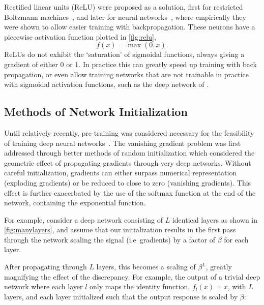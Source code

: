 \documentclass[thesis]{subfiles}
\begin{document}
Rectified linear units (ReLU) were proposed as a solution, first for restricted Boltzmann machines~\citep{conf/icml/NairH10}, and later for neural networks~\citep{glorot2010understanding}, where empirically they were shown to allow easier training with backpropagation. These neurons have a piecewise activation function plotted in \cref{fig:relu}, 
\begin{equation}
f(x) = \max(0,x).
\end{equation} 
ReLUs do not exhibit the `saturation' of sigmoidal functions, always giving a gradient of either 0 or 1. In practice this can greatly speed up training with back propagation, or even allow training networks that are not trainable in practice with sigmoidal activation functions, such as the deep network of \citet{Krizhevsky2012}.

\subsection{Methods of Network Initialization}\label{ssec:init}
Until relatively recently, pre-training was considered necessary for the feasibility of training deep neural networks~\citep{hinton2006reducing}. The vanishing gradient problem was first addressed through better methods of random initialization which considered the geometric effect of propagating gradients through very deep networks. Without careful initialization, gradients can either surpass numerical representation (exploding gradients) or be reduced to close to zero (vanishing gradients). This effect is further exacerbated by the use of the softmax function at the end of the network, containing the exponential function.

For example, consider a deep network consisting of $L$ identical layers as shown in \cref{fig:manylayers}, and assume that our initialization results in the first pass through the network scaling the signal (i.e~gradients) by a factor of $\beta$ for each layer.

After propagating through $L$ layers, this becomes a scaling of $\beta^L$, greatly magnifying the effect of the discrepancy. For example, the output of a trivial deep network  where each layer $l$ only maps the identity function, $f_{l}(x) = x$, with $L$ layers, and each layer initialized such that the output response is scaled by $\beta$:
\end{document}

